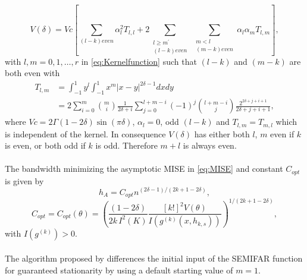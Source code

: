\documentclass[12pt]{article}
\begin{document}
\begin{equation}
\label{eq:VarianceUnified}
V(\delta) = Vc\left[ \sum_{(l-k)even} \alpha_{l}^{2}T_{l,l}+2 \sum_{\substack{l\geq m^{\prime}\\(l-k)even}}\, \sum_{\substack{m<l\\(m-k)even}} \alpha_{l}\alpha_{m}T_{l,m} \right],  
\end{equation}
with \(l,m = 0,1,\ldots,r\) in \eqref{eq:Kernelfunction} such that \((l-k)\) and \((m-k)\) are both even with
\begin{equation}
\label{eq:Tlm}
\begin{split}
T_{l,m} & = \int_{-1}^{1} y^{l} \int_{-1}^{1} x^{m} |x-y|^{2\delta-1}dxdy \\
& = 2\sum_{i=0}^{m} {m\choose i}\frac{1}{2\delta+i} \sum_{j=0}^{l+m-i} (-1)^{j} {l+m-i\choose j}\frac{2^{2\delta+j+i+1}}{2\delta+j+i+1},
\end{split}
\end{equation}
where \(Vc = 2 \Gamma (1-2\delta) \sin(\pi \delta) \), \( \alpha_l = 0 \), odd	\((l-k)\) and \( T_{l,m} = T_{m,l} \) which is independent of the kernel. 
In consequence \(V(\delta)\) has either both \(l\), \(m\) even if \(k\) is even, or both odd if \(k\) is odd. Therefore \(m+l\) is always even. \\
\\
The bandwidth minimizing the asymptotic MISE in \eqref{eq:MISE} and constant \(C_{opt}\) is given by
\begin{equation}
\label{eq:AsymptoticBandwidth}
h_A = C_{opt}n^{(2\delta-1)/(2k+1-2\delta)}, 
\end{equation} 
\begin{equation}
\label{eq:Constant}
C_{opt} =  C_{opt}(\theta) = \left( \frac{(1-2\delta)}{2k\, I^{2}(K)} \frac{[k!]^{2}V(\theta)}{I(g^{(k)}(x,h_{k,s}))} \right)^{1/(2k+1-2\delta)},
\end{equation}
with \(I(g^{(k)}) > 0\).\\
\\
The algorithm proposed by \textcite{beran2016long} differences the initial input of the SEMIFAR function for guaranteed stationarity by using a default starting value of \(m=1\).
\end{document}
